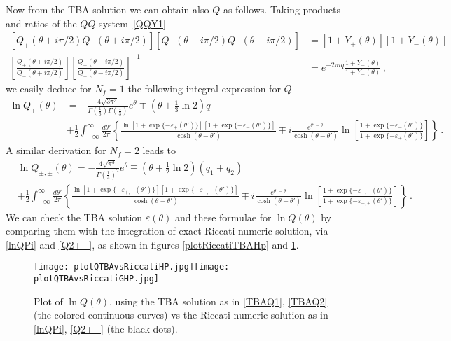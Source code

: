 \documentclass[11pt,a4paper]{elsarticle}
\def \th {\theta}
\def \ba {\begin{aligned}}
\def \ea {\end{aligned}}
\newcommand{\be}{\begin{equation}}
\newcommand{\ee}{\end{equation}}
\def\th{\theta}
\numberwithin{figure}{section}
\numberwithin{table}{section}
\begin{document}
Now from the TBA solution we can obtain also $Q$ as follows. Taking products and ratios of the $QQ$ system~\eqref{QQY1}
\be 
\ba 
[Q_+(\th+i \pi/2)Q_-(\th+i\pi/2)][Q_+(\th-i \pi/2)Q_-(\th-i\pi/2)] &=[1+Y_+(\th)][1+Y_-(\th)]\\
\left[\frac{Q_+(\th+i \pi/2)}{Q_-(\th+i\pi/2)} \right]\left[\frac{Q_+(\th-i \pi/2)}{Q_-(\th-i\pi/2)} \right]^{-1} &=e^{-2\pi i q}\frac{1+Y_+(\th)}{1+Y_-(\th)}\,,
\ea
\ee
we easily deduce for $N_f=1$ the following integral expression for $Q$  
\be
\ba \label{TBAQ1}
\ln Q_\pm(\th) &= -\frac{4   \sqrt{3\pi^{3}}}{\Gamma \left(\frac{1}{6}\right) \Gamma \left(\frac{1}{3}\right)} e^\th\mp( \th + \frac{1}{3} \ln 2) q \\
&+\frac{1}{2} \int_{-\infty}^\infty \frac{d\th'}{2\pi}\left \{ \frac{\ln[1+\exp \{-\varepsilon_+(\th')   \} ][1+\exp \{-\varepsilon_-(\th')  \} ]}{\cosh(\th-\th')}\mp i \frac{e^{\th'-\th}}{\cosh(\th-\th')} \ln\left[\frac{1+\exp \{-\varepsilon_-(\th')  \} }{1+\exp \{-\varepsilon_+(\th') \} }\right]\right \} \,.
\ea
\ee
A similar derivation for $N_f=2$ leads to
\be
\ba \label{TBAQ2}
&\ln Q_{\pm,\pm}(\th) = -\frac{4   \sqrt{\pi^{3}}}{\Gamma \left(\frac{1}{4}\right)^2} e^\th\mp( \th + \frac{1}{2} \ln 2) (q_1+q_2) \\
&+\frac{1}{2} \int_{-\infty}^\infty \frac{d\th'}{2\pi}\left \{ \frac{\ln[1+\exp \{-\varepsilon_{+,-}(\th')   \} ][1+\exp \{-\varepsilon_{-,+}(\th')  \} ]}{\cosh(\th-\th')}\mp i \frac{e^{\th'-\th}}{\cosh(\th-\th')} \ln\left[\frac{1+\exp \{-\varepsilon_{+,-}(\th')  \} }{1+\exp \{-\varepsilon_{-,+}(\th') \} }\right]\right \} %
\,.
\ea
\ee
We can check the TBA solution $\varepsilon(\theta)$ and these formulae for $\ln Q(\theta)$ by comparing  them with the integration of exact Riccati numeric solution, via \eqref{lnQPi} and \eqref{Q2++}, as shown in figures \ref{plotRiccatiTBAHp} and \ref{plotRiccatiTBAGhp}.


\begin{figure}
\centering
\texttt{[image: plotQTBAvsRiccatiHP.jpg]}\quad\texttt{[image: plotQTBAvsRiccatiGHP.jpg]}
\caption{Plot of $\ln Q(\theta)$, using the TBA solution as in \eqref{TBAQ1}, \eqref{TBAQ2} (the colored continuous curves) vs the Riccati numeric solution as in \eqref{lnQPi}, \eqref{Q2++} (the black dots).}
\label{plotRiccatiTBAGhp}
\end{figure}
\end{document}
